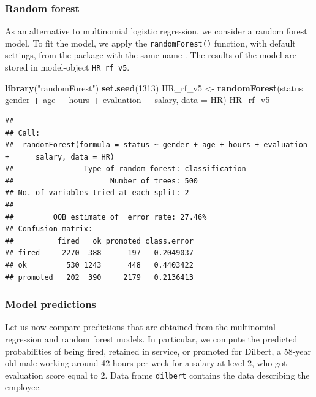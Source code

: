 \documentclass[12pt,]{krantz}
\newenvironment{Shaded}{\begin{snugshade}}{\end{snugshade}}
\newcommand{\DataTypeTok}[1]{\textcolor[rgb]{0.13,0.29,0.53}{#1}}
\newcommand{\DecValTok}[1]{\textcolor[rgb]{0.00,0.00,0.81}{#1}}
\newcommand{\KeywordTok}[1]{\textcolor[rgb]{0.13,0.29,0.53}{\textbf{#1}}}
\newcommand{\NormalTok}[1]{#1}
\newcommand{\OperatorTok}[1]{\textcolor[rgb]{0.81,0.36,0.00}{\textbf{#1}}}
\newcommand{\StringTok}[1]{\textcolor[rgb]{0.31,0.60,0.02}{#1}}
\begin{document}
\hypertarget{model-HR-rf}{%
\subsubsection{Random forest}\label{model-HR-rf}}

As an alternative to multinomial logistic regression, we consider a random forest model. To fit the model, we apply the \texttt{randomForest()} function, with default settings, from the package with the same name \citep{randomForestRNews}.
The results of the model are stored in model-object \texttt{HR\_rf\_v5}.

\begin{Shaded}
\begin{Highlighting}[]
\KeywordTok{library}\NormalTok{(}\StringTok{"randomForest"}\NormalTok{)}
\KeywordTok{set.seed}\NormalTok{(}\DecValTok{1313}\NormalTok{)}
\NormalTok{HR_rf_v5 <-}\StringTok{ }\KeywordTok{randomForest}\NormalTok{(status }\OperatorTok{~}\StringTok{ }\NormalTok{gender }\OperatorTok{+}\StringTok{ }\NormalTok{age }\OperatorTok{+}\StringTok{ }\NormalTok{hours }\OperatorTok{+}\StringTok{ }\NormalTok{evaluation }\OperatorTok{+}\StringTok{ }\NormalTok{salary, }\DataTypeTok{data =}\NormalTok{ HR)}
\NormalTok{HR_rf_v5}
\end{Highlighting}
\end{Shaded}

\begin{verbatim}
## 
## Call:
##  randomForest(formula = status ~ gender + age + hours + evaluation +      salary, data = HR) 
##                Type of random forest: classification
##                      Number of trees: 500
## No. of variables tried at each split: 2
## 
##         OOB estimate of  error rate: 27.46%
## Confusion matrix:
##          fired   ok promoted class.error
## fired     2270  388      197   0.2049037
## ok         530 1243      448   0.4403422
## promoted   202  390     2179   0.2136413
\end{verbatim}

\hypertarget{predictionsHR}{%
\subsubsection{Model predictions}\label{predictionsHR}}

Let us now compare predictions that are obtained from the multinomial regression and random forest models. In particular, we compute the predicted probabilities of being fired, retained in service, or promoted for Dilbert, a 58-year old male working around 42 hours per week for a salary at level 2, who got evaluation score equal to 2. Data frame \texttt{dilbert} contains the data describing the employee.
\end{document}
